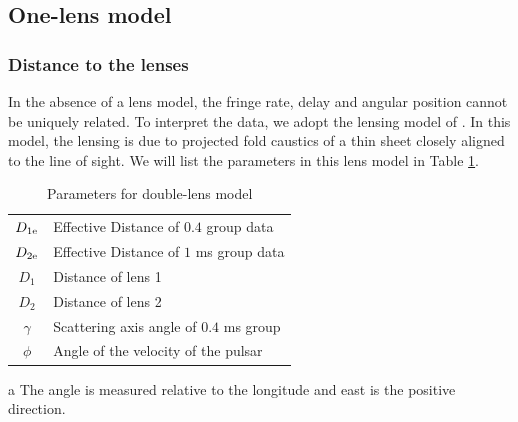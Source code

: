 \documentclass[useAMS,usenatbib]{mn2e}
\begin{document}
\subsection{One-lens model}
\subsubsection{Distance to the lenses}
In the absence of a lens model, the
fringe rate, delay and angular position cannot be uniquely related. To interpret the data, we adopt the lensing model of
\citet{2014MNRAS.442.3338P}.  In this model, the lensing is due to projected fold caustics of a thin sheet closely aligned to the line of sight. We will list the parameters in this lens model in Table \ref{tab:parameters}.

\begin{table}
\caption{Parameters for double-lens model}
\begin{threeparttable}
\begin{tabular}{cl}
\hline
$D_{1\rm e}$  & 
Effective Distance of $0.4$ group data\\
$D_{2\rm e}$ 
	&  Effective Distance of $1$ ms group data\\
$D_1$ 		&  Distance of lens 1 \\
$D_2$	& Distance of lens 2 \\
$\gamma$ &  Scattering axis angle of $0.4$ ms group\tnote{a} \\
$\phi$	& Angle of the velocity of the pulsar\tnote{a}\\
\hline
\end{tabular}

\begin{tablenotes}
\item[a]{The angle is measured relative to the longitude and east is the positive direction.}
\end{tablenotes}
\label{tab:parameters}
\end{threeparttable}
\end{table}


\end{document}
